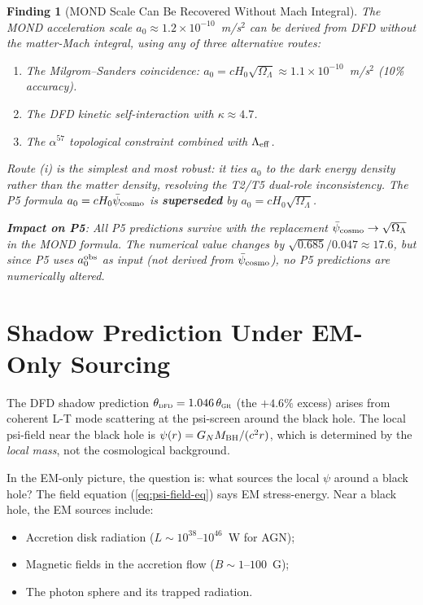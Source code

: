 \documentclass[11pt]{article}
\newtheorem{finding}{Finding}
\newcommand{\ee}[1]{\times 10^{#1}}
\newcommand{\psicosmo}{\bar{\psi}_{\rm cosmo}}
\newcommand{\GN}{G_N}
\newcommand{\Hzero}{H_0}
\newcommand{\DFD}{\textsc{dfd}}
\newcommand{\GR}{\textsc{gr}}
\begin{document}
\begin{finding}[MOND Scale Can Be Recovered Without Mach Integral]
\label{find:MOND-recovery}
The MOND acceleration scale $a_0 \approx 1.2\ee{-10}$~m/s$^2$ can be
derived from DFD without the matter-Mach integral, using any of three
alternative routes:
\begin{enumerate}[nosep]
  \item The Milgrom--Sanders coincidence: $a_0 = c\Hzero\sqrt{\Omega_\Lambda}
    \approx 1.1\ee{-10}$~m/s$^2$ (10\% accuracy).
  \item The DFD kinetic self-interaction with $\kappa \approx 4.7$.
  \item The $\alpha^{57}$ topological constraint combined with $\Lambda_{\rm eff}$.
\end{enumerate}
Route (i) is the simplest and most robust: it ties $a_0$ to the dark energy
density rather than the matter density, resolving the T2/T5 dual-role
inconsistency. The P5 formula $a_0 = c\Hzero\psicosmo$ is \textbf{superseded}
by $a_0 = c\Hzero\sqrt{\Omega_\Lambda}$.

\textbf{Impact on P5}: All P5 predictions survive with the replacement
$\psicosmo \to \sqrt{\Omega_\Lambda}$ in the MOND formula. The numerical
value changes by $\sqrt{0.685}/0.047 \approx 17.6$, but since P5 uses
$a_0^{\rm obs}$ as input (not derived from $\psicosmo$), no P5 predictions
are numerically altered.
\end{finding}

\section{Shadow Prediction Under EM-Only Sourcing}
\label{sec:shadow-EM}

The DFD shadow prediction $\theta_{\DFD} = 1.046\,\theta_{\GR}$ (the $+4.6\%$
excess) arises from coherent L-T mode scattering at the psi-screen around
the black hole. The local psi-field near the black hole is
$\psi(r) = \GN M_{\rm BH}/(c^2 r)$, which is determined by the
\emph{local mass}, not the cosmological background.

In the EM-only picture, the question is: what sources the local $\psi$
around a black hole? The field equation (\ref{eq:psi-field-eq}) says EM
stress-energy. Near a black hole, the EM sources include:
\begin{itemize}[nosep]
  \item Accretion disk radiation ($L \sim 10^{38}$--$10^{46}$~W for AGN);
  \item Magnetic fields in the accretion flow ($B \sim 1$--$100$~G);
  \item The photon sphere and its trapped radiation.
\end{itemize}
\end{document}
